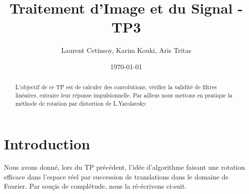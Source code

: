 \documentclass[12pt]{article}
\title{Traitement d'Image et du Signal - TP3}
\author{Laurent Cetinsoy, Karim Kouki, Aris Tritas }
\date{\today}
\begin{document}
\maketitle

\begin{abstract}
L'objectif de ce TP est de calculer des convolutions, vérifier la validité de filtres linéaires, extraire leur réponse impulsionnelle. Par ailleus nous mettons en pratique la méthode de rotation par distortion de L.Yarolavsky.
\end{abstract}

\section*{Introduction}
Nous avons donné, lors du TP précédent, l'idée d'algorithme faisant une rotation efficace dans l'espace réel par succession de translations dans le domaine de Fourier. Par souçis de complétude, nous la ré-écrivons ci-suit.
\end{document}
